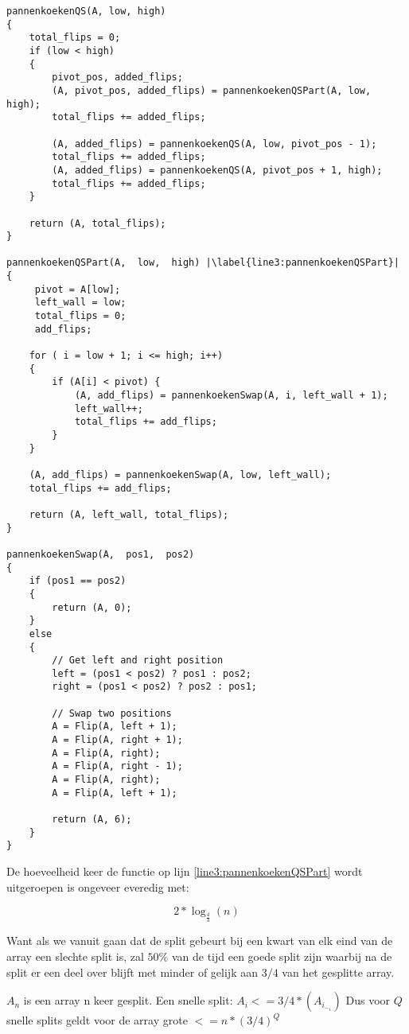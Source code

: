 \begin{lstlisting}[caption=Quick Sort Variant, escapechar=|]
pannenkoekenQS(A, low, high)
{
    total_flips = 0;
    if (low < high)
    {
        pivot_pos, added_flips;
        (A, pivot_pos, added_flips) = pannenkoekenQSPart(A, low, high);
        total_flips += added_flips;

        (A, added_flips) = pannenkoekenQS(A, low, pivot_pos - 1);
        total_flips += added_flips;
        (A, added_flips) = pannenkoekenQS(A, pivot_pos + 1, high);
        total_flips += added_flips;
    }

    return (A, total_flips);
}

pannenkoekenQSPart(A,  low,  high) |\label{line3:pannenkoekenQSPart}|
{
     pivot = A[low];
     left_wall = low;
     total_flips = 0;
     add_flips;

    for ( i = low + 1; i <= high; i++) 
    {
        if (A[i] < pivot) {
            (A, add_flips) = pannenkoekenSwap(A, i, left_wall + 1);
            left_wall++;
            total_flips += add_flips;
        }
    }

    (A, add_flips) = pannenkoekenSwap(A, low, left_wall);
    total_flips += add_flips;

    return (A, left_wall, total_flips);
}

pannenkoekenSwap(A,  pos1,  pos2)
{
    if (pos1 == pos2)
    {
        return (A, 0);
    }
    else
    {
        // Get left and right position
        left = (pos1 < pos2) ? pos1 : pos2;
        right = (pos1 < pos2) ? pos2 : pos1;

        // Swap two positions
        A = Flip(A, left + 1);
        A = Flip(A, right + 1);
        A = Flip(A, right);
        A = Flip(A, right - 1);
        A = Flip(A, right);
        A = Flip(A, left + 1);

        return (A, 6);
    }
}
\end{lstlisting}

De hoeveelheid keer de functie op lijn \ref{line3:pannenkoekenQSPart} wordt uitgeroepen is ongeveer everedig met:

\[2*\log_{\frac{4}{3}}(n)\]

Want als we vanuit gaan dat de split gebeurt bij een kwart van elk eind van de array een slechte split is, 
zal $50\%$ van de tijd een goede split zijn waarbij na de split er een deel over blijft met minder of gelijk aan $3/4$ van het gesplitte array.

$A_n$ is een array n keer gesplit. 
Een snelle split: $A_i <= 3/4 * (A_i_-_1)$
Dus voor $Q$ snelle splits geldt voor de array grote $<= n*(3/4)^Q$

